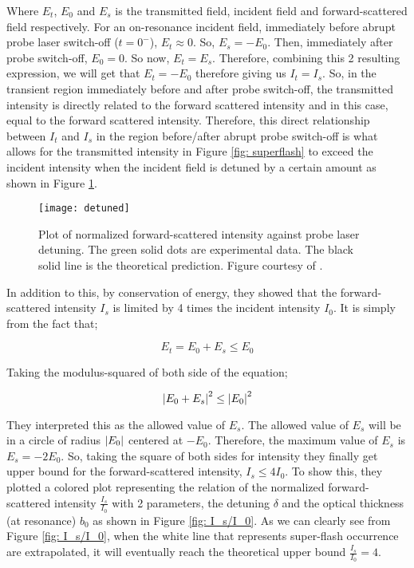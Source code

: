 Where $E_{t}$, $E_{0}$ and $E_{s}$ is the transmitted field, incident field and forward-scattered field respectively. For an on-resonance incident field, immediately before abrupt probe laser switch-off ($t = 0^{-}$), $E_{t} \approx 0$. So, $E_{s} = - E_{0}$. Then, immediately after probe switch-off, $E_{0} = 0$. So now, $E_{t} = E_{s}$. Therefore, combining this 2 resulting expression, we will get that $E_{t} = - E_{0}$ therefore giving us $I_{t} = I_{s}$. So, in the transient region immediately before and after probe switch-off, the transmitted intensity is directly related to the forward scattered intensity and in this case, equal to the forward scattered intensity. Therefore, this direct relationship between $I_{t}$ and $I_{s}$ in the region before/after abrupt probe switch-off is what allows for the transmitted intensity in Figure \ref{fig: superflash} to exceed the incident intensity when the incident field is detuned by a certain amount as shown in Figure \ref{fig: detuned}. 

\begin{figure}[h!]
    \centering
    \texttt{[image: detuned]}
    \caption{Plot of normalized forward-scattered intensity against probe laser detuning. The green solid dots are experimental data. The black solid line is the theoretical prediction. Figure courtesy of \cite{Kwong2014}.}
    \label{fig: detuned}
\end{figure}

In addition to this, by conservation of energy, they showed that the forward-scattered intensity $I_{s}$ is limited by 4 times the incident intensity $I_{0}$. It is simply from the fact that;

\begin{equation}
    E_{t} = E_{0} + E_{s} \leq E_{0}
\end{equation}

Taking the modulus-squared of both side of the equation;

\begin{equation}
    \abs{E_{0} + E_{s}}^{2} \leq \abs{E_{0}}^{2}
\end{equation}

They interpreted this as the allowed value of $E_{s}$. The allowed value of $E_{s}$ will be in a circle of radius $\abs{E_{0}}$ centered at $-E_{0}$. Therefore, the maximum value of $E_{s}$ is $E_{s} = -2 E_{0}$. So, taking the square of both sides for intensity they finally get upper bound for the forward-scattered intensity, $I_{s} \leq 4 I_{0}$. To show this, they plotted a colored plot representing the relation of the normalized forward-scattered intensity $\frac{I_{s}}{I_{0}}$ with 2 parameters, the detuning $\delta$ and the optical thickness (at resonance) $b_{0}$ as shown in Figure \ref{fig: I_s/I_0}. As we can clearly see from Figure \ref{fig: I_s/I_0}, when the white line that represents super-flash occurrence are extrapolated, it will eventually reach the theoretical upper bound $\frac{I_{s}}{I_{0}} = 4$.\\

